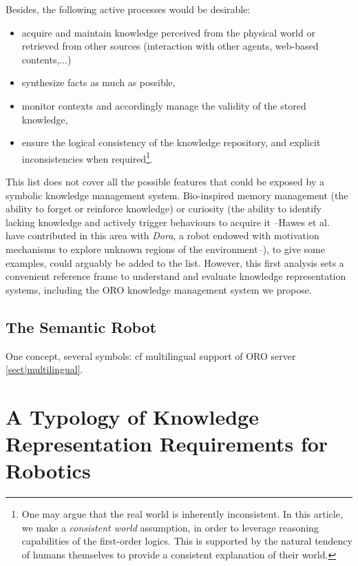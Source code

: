 Besides, the following active processes would be desirable:
\begin{itemize}
	\item acquire and maintain knowledge perceived from the physical world or
	retrieved from other sources (interaction with other agents, web-based contents,...)
	\item synthesize facts as much as possible,
	\item monitor contexts and accordingly manage the validity of the stored knowledge,
	\item ensure the logical consistency of the knowledge repository, and
	explicit inconsistencies when required\footnote{One may argue that the real world is 
	inherently inconsistent. In this article, we make a
	\textit{consistent world} assumption, in order to leverage reasoning
	capabilities of the first-order logics. This is supported by the natural
	tendency of humans themselves to provide a consistent explanation of their
	world.}.
\end{itemize}

This list does not cover all the possible features that could be exposed by a
symbolic knowledge management system. Bio-inspired memory management (the
ability to forget or reinforce knowledge) or curiosity (the ability to identify
lacking knowledge and actively trigger behaviours to acquire it --Hawes et
al.~\cite{Hawes2011} have contributed in this area with \emph{Dora}, a
robot endowed with motivation mechanisms to explore unknown regions of
the environment--), to give some examples, could arguably be added to the list.
However, this first analysis sets a convenient reference frame to understand
and evaluate knowledge representation systems, including the \textsc{ORO}
knowledge management system we propose.

\subsection{The Semantic Robot}
\label{sect|semantic}


One concept, several symbols: cf multilingual support of ORO server \ref{sect|multilingual}.


\section{A Typology of Knowledge Representation Requirements for Robotics}
\label{sect|features}

